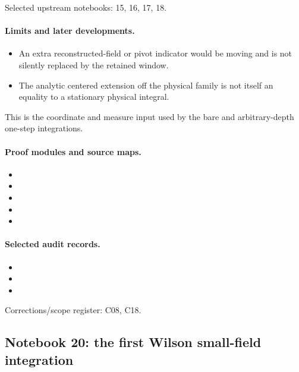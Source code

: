 \documentclass[11pt]{article}
\theoremstyle{remark}
\begin{document}
Selected upstream notebooks: 15, 16, 17, 18.\par

\paragraph{Limits and later developments.}
\begin{itemize}
\item An extra reconstructed-field or pivot indicator would be moving and is not silently replaced by the retained window.
\item The analytic centered extension off the physical family is not itself an equality to a stationary physical integral.
\end{itemize}

This is the coordinate and measure input used by the bare and arbitrary-depth one-step integrations.

\paragraph{Proof modules and source maps.}
\begingroup\small
\begin{itemize}
\item {}
\item {}
\item {}
\item {}
\item {}
\end{itemize}
\endgroup

\paragraph{Selected audit records.}
\begingroup\small
\begin{itemize}
\item {}
\item {}
\item {}
\end{itemize}
\endgroup
Corrections/scope register: C08, C18.\par

\subsection{Notebook 20: the first Wilson small-field integration}
\label{hnc-20}
\noindent{}\par
\end{document}
